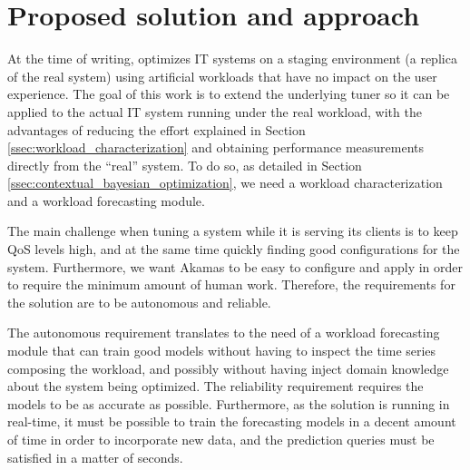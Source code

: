 \documentclass[a4paper, 12pt]{article} %
\begin{document}
	\section{Proposed solution and approach } \label{sec:proposed_solution}
	At the time of writing, \cite{AkamasCGP} optimizes IT systems on a staging environment (a replica of the real system) using artificial workloads that have no impact on the user experience. The goal of this work is to extend the underlying tuner so it can be applied to the actual IT system running under the real workload, with the advantages of reducing the effort explained in Section \ref{ssec:workload_characterization} and obtaining performance measurements directly from the ``real'' system. To do so, as detailed in Section \ref{ssec:contextual_bayesian_optimization}, we need a workload characterization and a workload forecasting module.
	
	The main challenge when tuning a system while it is serving its clients is to keep QoS levels high, and at the same time quickly finding good configurations for the system. Furthermore, we want Akamas to be easy to configure and apply in order to require the minimum amount of human work. Therefore, the requirements for the solution are to be autonomous and reliable.
	
	The autonomous requirement translates to the need of a workload forecasting module that can train good models without having to inspect the time series composing the workload, and possibly without having inject domain knowledge about the system being optimized. The reliability requirement requires the models to be as accurate as possible. Furthermore, as the solution is running in real-time, it must be possible to train the forecasting models in a decent amount of time in order to incorporate new data, and the prediction queries must be satisfied in a matter of seconds.
	
\end{document}
